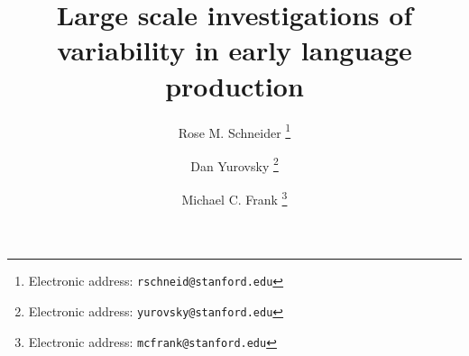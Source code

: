 \documentclass[10pt, a4paper]{article}
\begin{document}
\singlespacing

\title{Large scale investigations of variability in early language production}
\author{Rose M. Schneider%
	\thanks{Electronic address: \texttt{rschneid@stanford.edu}}}

\author{Dan Yurovsky%
	\thanks{Electronic address: \texttt{yurovsky@stanford.edu}}}

\author{Michael C. Frank%
	\thanks{Electronic address: \texttt{mcfrank@stanford.edu}}}

\maketitle
\end{document}
